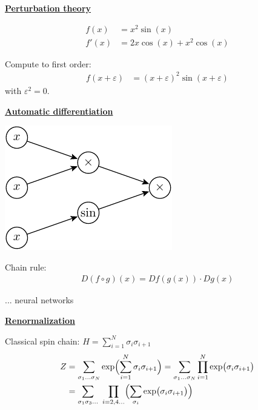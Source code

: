\documentclass[11pt]{article}
\def\heading #1{\centerline{\underline{\bf\LARGE #1}}}
\def\vsp {\vskip 0.5cm}
\begin{document}
\newpage %

\heading{Perturbation theory}

\begin{align*}
    f(x) &= x^2 \sin(x) \\
    f'(x) &= 2x\cos(x) + x^2 \cos(x)
\end{align*}

Compute to first order:
\begin{align*}
    f(x+\varepsilon) &= (x+\varepsilon)^2 \sin(x+\varepsilon)
\end{align*}
with $\varepsilon^2 = 0.$


\newpage %

\heading{Automatic differentiation}

\centerline{\includegraphics[]{pic-diff.pdf}}

Chain rule:
\begin{align*}
    D(f\circ g)(x) = Df(g(x))\cdot Dg(x)
\end{align*}

... neural networks

\newpage %

\heading{Renormalization}

\vsp
Classical spin chain: $H = \sum_{i=1}^N \sigma_i\sigma_{i+1}$ 
\begin{align*}
    Z &= \sum_{\sigma_1...\sigma_N} \exp\Bigl( \sum_{i=1}^N \sigma_i\sigma_{i+1} \Bigr) 
       = \sum_{\sigma_1...\sigma_N} \prod_{i=1}^N  \exp\bigl( \sigma_i\sigma_{i+1} \bigr) \\
      &= \sum_{\sigma_1\sigma_3...} \ \prod_{i=2,4...} \Bigl(
        \sum_{\sigma_i} \exp\bigl( \sigma_i\sigma_{i+1} \bigr) \Bigr) \\
\end{align*}

\newpage %
\end{document}

